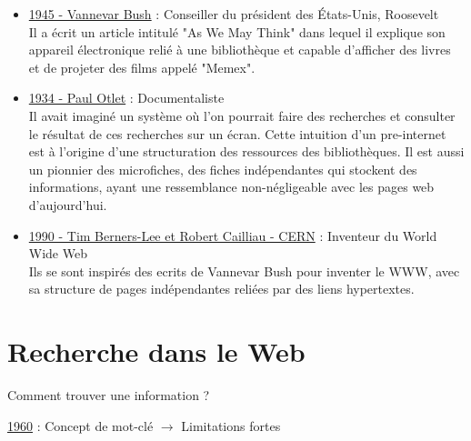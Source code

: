     \begin{itemize}
        \item \underline{1945 - Vannevar Bush} : Conseiller du président des États-Unis, Roosevelt\\ 
        Il a écrit un article intitulé "As We May Think" dans lequel il explique son appareil électronique relié à une bibliothèque et capable d'afficher des livres et de projeter des films appelé "Memex".
        \item \underline{1934 - Paul Otlet} : Documentaliste\\ 
        Il avait imaginé un système où l'on pourrait faire des recherches et consulter le résultat de ces recherches sur un écran. Cette intuition d'un pre-internet est à l'origine d'une structuration des ressources des bibliothèques. Il est aussi un pionnier des microfiches, des fiches indépendantes qui stockent des informations, ayant une ressemblance non-négligeable avec les pages web d'aujourd'hui.
        \item \underline{1990 - Tim Berners-Lee et  Robert Cailliau - CERN} : Inventeur du World Wide Web\\
        Ils se sont inspirés des ecrits de Vannevar Bush pour inventer le WWW, avec sa structure de pages indépendantes reliées par des liens hypertextes.
    \end{itemize}
    
\vspace * {0.5cm}   


\chapter{Recherche dans le Web} %
Comment trouver une information ?
\vspace{0.3cm}

\underline{1960} : Concept de mot-clé $\rightarrow$ Limitations fortes

